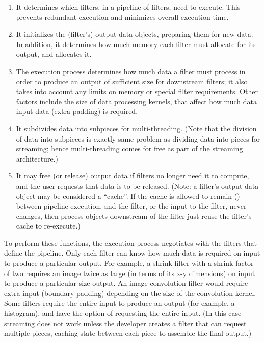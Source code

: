 \begin{enumerate}
        \item It determines which filters, in a pipeline of filters, need to
        execute. This prevents redundant execution and minimizes overall
        execution time.

        \item It initializes the (filter's) output data objects, preparing
        them for new data.  In addition, it determines how much memory each
        filter must allocate for its output, and allocates it.

        \item The execution process determines how much data a filter must
        process in order to produce an output of sufficient size for
        downstream filters; it also takes into account any limits on memory
        or special filter requirements. Other factors include the size of
        data processing kernels, that affect how much data input data
        (extra padding) is required.

        \item It subdivides data into subpieces for multi-threading. (Note
        that the division of data into subpieces is exactly same problem as
        dividing data into pieces for streaming; hence multi-threading comes
        for free as part of the streaming architecture.)

        \item It may free (or release) output data if filters no longer need
        it to compute, and the user requests that data is to be
        released. (Note: a filter's output data object may be considered a
        ``cache''. If the cache is allowed to remain ()
        between pipeline execution, and the filter, or the input to the
        filter, never changes, then process objects downstream of the filter
        just reuse the filter's cache to re-execute.)
\end{enumerate}

To perform these functions, the execution process negotiates with the
filters that define the pipeline. Only each filter can know how much data is
required on input to produce a particular output. For example, a shrink
filter with a shrink factor of two requires an image twice as large (in terms
of its x-y dimensions) on input to produce a particular size output. An
image convolution filter would require extra input (boundary padding)
depending on the size of the convolution kernel. Some filters require the
entire input to produce an output (for example, a histogram), and have the
option of requesting the entire input. (In this case streaming does not work
unless the developer creates a filter that can request multiple pieces,
caching state between each piece to assemble the final output.)


